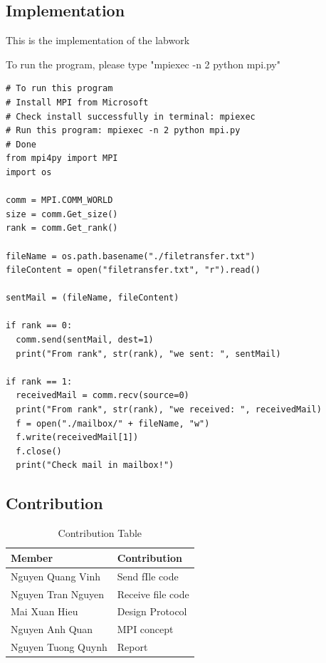 \documentclass[13pt]{article}
\begin{document}
\subsection{Implementation}
\noindent%
This is the implementation of the labwork

\noindent
To run the program, please type "mpiexec -n 2 python mpi.py"

\begin{verbatim}
# To run this program
# Install MPI from Microsoft
# Check install successfully in terminal: mpiexec
# Run this program: mpiexec -n 2 python mpi.py
# Done
from mpi4py import MPI
import os

comm = MPI.COMM_WORLD
size = comm.Get_size()
rank = comm.Get_rank()

fileName = os.path.basename("./filetransfer.txt")
fileContent = open("filetransfer.txt", "r").read()

sentMail = (fileName, fileContent)

if rank == 0:
  comm.send(sentMail, dest=1)
  print("From rank", str(rank), "we sent: ", sentMail)
  
if rank == 1:
  receivedMail = comm.recv(source=0)
  print("From rank", str(rank), "we received: ", receivedMail)
  f = open("./mailbox/" + fileName, "w")
  f.write(receivedMail[1])
  f.close()
  print("Check mail in mailbox!")
\end{verbatim}

\subsection{Contribution}
\noindent%
\begin{table}[ht!]
  \begin{center}
    \label{tab:table1}
    \begin{tabular}{l|l}
      \textbf{Member} & \textbf{Contribution}\\
      \hline
      Nguyen Quang Vinh & Send fIle code\\
      Nguyen Tran Nguyen & Receive file code\\
      Mai Xuan Hieu & Design Protocol\\
      Nguyen Anh Quan & MPI concept\\
      Nguyen Tuong Quynh & Report\\
    \end{tabular}
    \caption{Contribution Table}
  \end{center}
\end{table}
\end{document}
